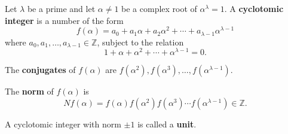 Let $\lambda$ be a prime and let $\alpha \neq 1$ be a complex root of $\alpha^\lambda = 1$. A \textbf{cyclotomic integer} is a number of the form
$$f(\alpha) = a_0 + a_1\alpha + a_2\alpha^2 + \cdots + a_{\lambda-1}\alpha^{\lambda-1}$$
where $a_0, a_1, \ldots, a_{\lambda-1} \in \mathbb{Z}$, subject to the relation
$$1 + \alpha + \alpha^2 + \cdots + \alpha^{\lambda-1} = 0.$$

The \textbf{conjugates} of $f(\alpha)$ are $f(\alpha^2), f(\alpha^3), \ldots, f(\alpha^{\lambda-1})$.

The \textbf{norm} of $f(\alpha)$ is
$$Nf(\alpha) = f(\alpha)f(\alpha^2)f(\alpha^3)\cdots f(\alpha^{\lambda-1}) \in \mathbb{Z}.$$

A cyclotomic integer with norm $\pm 1$ is called a \textbf{unit}.
